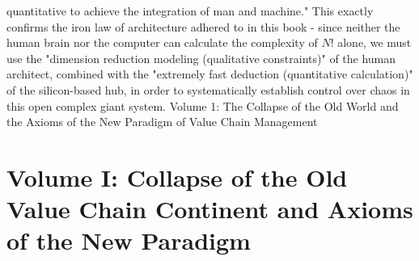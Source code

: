 \documentclass[11pt,a4paper]{article}
\begin{document}
quantitative to achieve the integration of man and machine." This exactly confirms the iron law of architecture adhered to in this book - since neither the human brain nor the computer can calculate the complexity of $N!$ alone, we must use the "dimension reduction modeling (qualitative constraints)" of the human architect, combined with the "extremely fast deduction (quantitative calculation)" of the silicon-based hub, in order to systematically establish control over chaos in this open complex giant system. Volume 1: The Collapse of the Old World and the Axioms of the New Paradigm of Value Chain Management

\newpage
\part*{Volume I: Collapse of the Old Value Chain Continent and Axioms of the New Paradigm}
\end{document}

